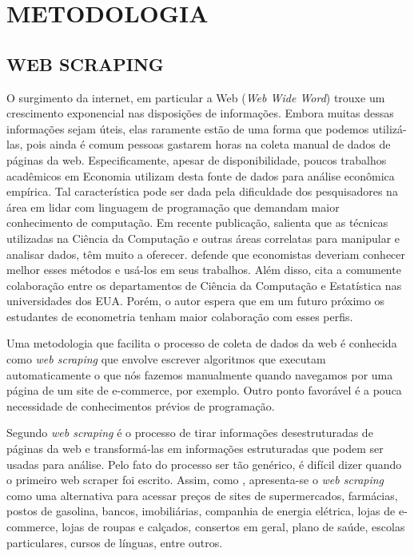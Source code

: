 \documentclass[twoside,a4paper,11pt]{report}
\begin{document}
\chapter{METODOLOGIA}\label{cap3}

\section*{WEB SCRAPING}

O surgimento da internet, em particular a Web (\emph{Web Wide Word}) trouxe um crescimento exponencial nas disposições de informações. Embora muitas dessas informações sejam úteis, elas raramente estão de uma forma que podemos utilizá-las, pois ainda é comum pessoas gastarem horas na coleta manual de dados de páginas da web.
Especificamente, apesar de disponibilidade, poucos trabalhos acadêmicos em Economia utilizam desta fonte de dados para análise econômica empírica. Tal característica pode ser dada pela dificuldade dos pesquisadores na área em lidar com linguagem de programação que demandam maior conhecimento de computação. Em recente publicação, \citet{varian2014big} salienta que as técnicas utilizadas na Ciência da Computação e outras áreas correlatas para manipular e analisar dados, têm muito a oferecer. \citet{varian2014big} defende que economistas deveriam conhecer melhor esses métodos e usá-los em seus trabalhos. Além disso, \citet{varian2014big} cita a comumente colaboração entre os departamentos de Ciência da Computação e Estatística nas universidades dos EUA. Porém, o autor espera que em um futuro próximo os estudantes de econometria tenham maior colaboração com esses perfis. 

Uma metodologia que facilita o processo de coleta de dados da web é conhecida como \emph{web scraping} que envolve escrever algoritmos que executam automaticamente o que nós fazemos manualmente quando navegamos por uma página de um site de e-commerce, por exemplo. Outro ponto favorável é a pouca necessidade de conhecimentos prévios de programação. 

Segundo \citet{manning2008introduction} \emph{web scraping} é o processo de tirar informações desestruturadas de páginas da web e transformá-las em informações estruturadas que podem ser usadas para análise.  Pelo fato do processo ser tão genérico, é difícil dizer quando o primeiro web scraper foi escrito. Assim, como \citet{cavallo2010scraped}, apresenta-se o \emph{web scraping} como uma alternativa para acessar preços de sites de supermercados, farmácias, postos de gasolina, bancos, imobiliárias, companhia de energia elétrica, lojas de e-commerce, lojas de roupas e calçados, consertos em geral, plano de saúde, escolas particulares, cursos de línguas, entre outros. 
\end{document}
